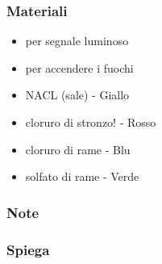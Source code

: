 \documentclass[../main.tex]{subfiles}
\begin{document}
        \subsubsection{Materiali}
        \begin{itemize}
            \item per segnale luminoso
            \item per accendere i fuochi
            \item NACL (sale) - Giallo
            \item cloruro di stronzo! - Rosso
            \item cloruro di rame - Blu
            \item solfato di rame - Verde
        \end{itemize}
        \subsubsection{Note}
        \subsubsection{Spiega}
   
\end{document}
